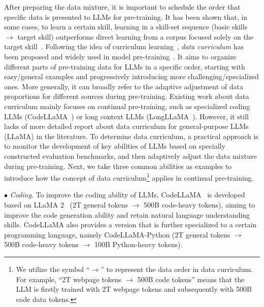 { 
{
After preparing the data mixture, it is important to schedule the order that specific data is presented to LLMs for pre-training. 
It has been shown that, in some cases, to learn a certain skill, learning in a skill-set sequence (\eg basic skills $\rightarrow$ target skill) outperforms direct learning from a corpus focused solely on the target skill~\cite{Chen-2023-arXiv-skill,Roziere-arxiv-2023-codellama}. 
Following the idea of curriculum learning~\cite{Bengio-2009-arXiv-curriculum}, \emph{data curriculum} has been proposed and widely used in model pre-training~\cite{Chen-2023-arXiv-skill,Xu-2023-arXiv-contrastive,Roziere-arxiv-2023-codellama,Tworkowski-arxiv-2023-Focused}. It aims to  organize different parts of pre-training data for LLMs in a specific order, \eg  starting  with easy/general examples and progressively introducing  more challenging/specialized ones. 
More generally, 
it can broadly refer to the adaptive adjustment of data proportions for different sources during pre-training. 
Existing work about  data curriculum mainly focuses on continual pre-training, such as specialized coding LLMs (\eg CodeLLaMA~\cite{Roziere-arxiv-2023-codellama}) or long context LLMs (\eg LongLLaMA~\cite{Tworkowski-arxiv-2023-Focused}).
However, it still lacks of more detailed report about data curriculum for general-purpose LLMs (\eg LLaMA) in the literature. 
To determine data curriculum, a practical approach is to monitor the development of key abilities of LLMs based on specially constructed evaluation benchmarks, and then adaptively adjust the data mixture during pre-training. 
Next, we take  three common abilities as examples to introduce how the concept of data curriculum\footnote{We utilize the symbol ``$\rightarrow$'' to represent the data order  in  data curriculum. For example, ``2T webpage  tokens $\rightarrow$ 500B code tokens'' means that the LLM is firstly trained with 2T webpage tokens and subsequently with 500B code data tokens. } applies in continual pre-training. 
}


{
$\bullet$ \emph{Coding}. To improve the coding ability of LLMs, CodeLLaMA~\cite{Roziere-arxiv-2023-codellama} is developed based on LLaMA 2~\cite{Touvron-2023-llama2-arxiv}
(2T general tokens $\rightarrow$ 500B code-heavy tokens), aiming to improve the code generation ability and retain natural language understanding skills.   CodeLLaMA also provides a version that is further specialized to a certain programming language, namely CodeLLaMA-Python (2T general tokens $\rightarrow$ 500B code-heavy tokens $\rightarrow$ 100B Python-heavy tokens).
}

}
